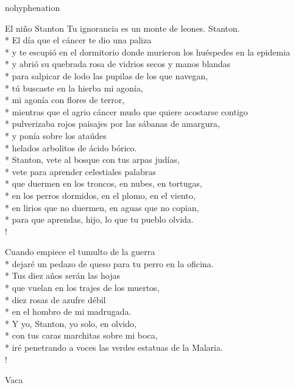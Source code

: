 \documentclass[
    a5paper,
    DIV=10,
    12pt,
    notitlepage,
    oneside,]
{scrbook} %
\begin{document}
\begin{hyphenrules}{nohyphenation}
\begin{poem}{El niño Stanton}{}{}
Tu ignorancia es un monte de leones. Stanton.\\*
El día que el cáncer te dio una paliza\\*
y te escupió en el dormitorio donde murieron los huéspedes en la epidemia\\*
y abrió su quebrada rosa de vidrios secos y manos blandas\\*
para salpicar de lodo las pupilas de los que navegan,\\*
tú buscaste en la hierba mi agonía,\\*
mi agonía con flores de terror,\\*
mientras que el agrio cáncer mudo que quiere acostarse contigo\\*
pulverizaba rojos paisajes por las sábanas de amargura,\\*
y ponía sobre los ataúdes\\*
helados arbolitos de ácido bórico.\\*
Stanton, vete al bosque con tus arpas judías,\\*
vete para aprender celestiales palabras\\*
que duermen en los troncos, en nubes, en tortugas,\\*
en los perros dormidos, en el plomo, en el viento,\\*
en lirios que no duermen, en aguas que no copian,\\*
para que aprendas, hijo, lo que tu pueblo olvida.\\!

Cuando empiece el tumulto de la guerra\\*
dejaré un pedazo de queso para tu perro en la oficina.\\*
Tus diez años serán las hojas\\*
que vuelan en los trajes de los muertos,\\*
diez rosas de azufre débil\\*
en el hombro de mi madrugada.\\*
Y yo, Stanton, yo solo, en olvido,\\*
con tus caras marchitas sobre mi boca,\\*
iré penetrando a voces las verdes estatuas de la Malaria.\\!

\end{poem}

\begin{poem}{Vaca}{}{\vspace{-1em}}


\end{poem}
\end{hyphenrules}
\end{document}
